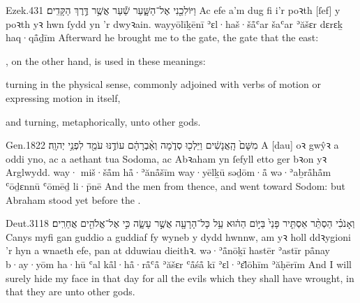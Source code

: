 \begin{example}{Ezek.}{43}{1}{}{}
	\quoling
	{וַיּוֹלִכֵ֖נִי אֶל־הַשָּׁ֑עַר שַׁ֕עַר אֲשֶׁ֥ר  דֶּ֥רֶךְ הַקָּדִֽים׃}
	{Ac efe a’m dug fi i’r poꝛth [ſef] y poꝛth yꝛ hwn ſydd yn   ’r dwyꝛain.}
	{wayyōlīḵēnī ʾɛl·haš·šå̄ʿar šaʿar ʾăšɛr  dɛrɛḵ haq·qå̄ḏīm}
	{Afterward he brought me to the gate,  the gate that   the east:}
\end{example}

\begin{paper}
	, on the other hand, is used in these meanings:
	\begin{compactitem}
		\item turning in the physical sense, commonly adjoined with verbs of motion or expressing motion in itself,
		\item and turning, metaphorically, unto other gods.
	\end{compactitem}
\end{paper}

\begin{example}{Gen.}{18}{22}{}{}
	\quoling
	{ מִשָּׁם֙ הָֽאֲנָשִׁ֔ים וַיֵּלְכ֖וּ סְדֹ֑מָה וְאַ֨בְרָהָ֔ם עוֹדֶ֥נּוּ עֹמֵ֖ד לִפְנֵ֥י יְהוָֽה׃}
	{A [dau] oꝛ gwŷꝛ a  oddi yno, ac a aethant tua Sodoma, ac Abꝛaham yn ſefyll  etto ger bꝛon yꝛ Arglwydd.}
	{way· miš·šå̄m hå̄·ʾănå̄šīm way·yēlḵū səḏōm·å̄ wə·ʾaḇrå̄hå̄m ʿōḏɛnnū ʿōmēḏ li·p̄nē {\YHWH}}
	{And the men  from thence, and went toward Sodom: but Abraham stood yet before the {\LORD}.}
\end{example}

\begin{example}{Deut.}{31}{18}{}{}
	\quoling
	{וְאָנֹכִ֗י הַסְתֵּ֨ר אַסְתִּ֤יר פָּנַי֙ בַּיּ֣וֹם הַה֔וּא עַ֥ל כָּל־הָרָעָ֖ה אֲשֶׁ֣ר עָשָׂ֑ה כִּ֣י  אֶל־אֱלֹהִ֖ים אֲחֵרִֽים׃}
	{Canys myfi gan guddio a guddiaf fy wyneb y dydd hwnnw, am yꝛ holl ddꝛygioni ’r hyn a wnaeth efe, pan  at dduwiau dieithꝛ.}
	{wə·ʾå̄nōḵī hastēr ʾastīr på̄nay b·ay·yōm ha·hū ʿal kå̄l·hå̄·rå̄ʿå̄ ʾăšɛr ʿå̄śå̄ kī  ʾɛl·ʾɛ̆lōhīm ʾăḥērīm}
	{And I will surely hide my face in that day for all the evils which they shall have wrought, in that they are  unto other gods.}
\end{example}




